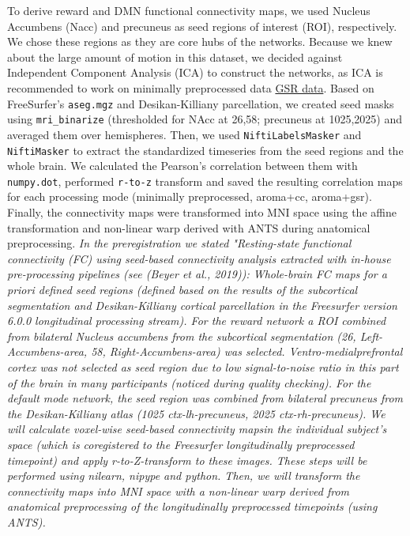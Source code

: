 \documentclass[
]{article}
\begin{document}
To derive reward and DMN functional connectivity maps, we used Nucleus Accumbens (Nacc) and precuneus as seed regions of interest (ROI), respectively. We chose these regions as they are core hubs of the networks. Because we knew about the large amount of motion in this dataset, we decided against Independent Component Analysis (ICA) to construct the networks, as ICA is recommended to work on minimally preprocessed data \href{https://sourceforge.net/p/icatb/mailman/message/31466068/}{GSR data}. Based on FreeSurfer's \texttt{aseg.mgz} and Desikan-Killiany parcellation, we created seed masks using \texttt{mri\_binarize} (thresholded for NAcc at 26,58; precuneus at 1025,2025) and averaged them over hemispheres. Then, we used \texttt{NiftiLabelsMasker} and \texttt{NiftiMasker} to extract the standardized timeseries from the seed regions and the whole brain. We calculated the Pearson's correlation between them with \texttt{numpy.dot}, performed \texttt{r-to-z} transform and saved the resulting correlation maps for each processing mode (minimally preprocessed, aroma+cc, aroma+gsr). Finally, the connectivity maps were transformed into MNI space using the affine transformation and non-linear warp derived with ANTS during anatomical preprocessing.
\emph{In the preregistration we stated "Resting-state functional connectivity (FC) using seed-based connectivity analysis extracted with in-house pre-processing pipelines (see (Beyer et al., 2019)): Whole-brain FC maps for a priori defined seed regions (defined based on the results of the subcortical segmentation and Desikan-Killiany cortical parcellation in the Freesurfer version 6.0.0 longitudinal processing stream). For the reward network a ROI combined from bilateral Nucleus accumbens from the subcortical segmentation (26, Left-Accumbens-area, 58, Right-Accumbens-area) was selected. Ventro-medialprefrontal cortex was not selected as seed region due to low signal-to-noise ratio in this part of the brain in many participants (noticed during quality checking). For the default mode network, the seed region was combined from bilateral precuneus from the Desikan-Killiany atlas (1025 ctx-lh-precuneus, 2025 ctx-rh-precuneus). We will calculate voxel-wise seed-based connectivity mapsin the individual subject's space (which is coregistered to the Freesurfer longitudinally preprocessed timepoint) and apply r-to-Z-transform to these images. These steps will be performed using nilearn, nipype and python. Then, we will transform the connectivity maps into MNI space with a non-linear warp derived from anatomical preprocessing of the longitudinally preprocessed timepoints (using ANTS).}
\end{document}
